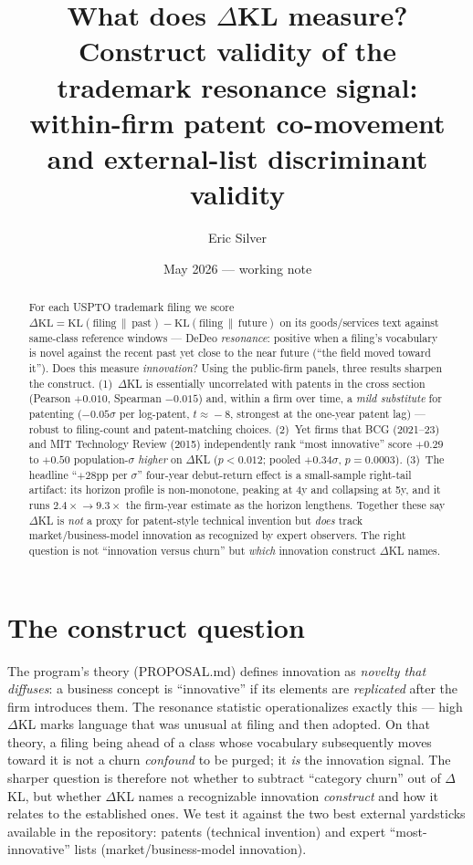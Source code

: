 \documentclass[11pt]{article}
\title{\bfseries What does $\Delta$KL measure?\\
\large Construct validity of the trademark resonance signal:\\
within-firm patent co-movement and external-list discriminant validity}
\author{Eric Silver}
\date{May 2026 --- working note}
\newcommand{\dkl}{$\Delta$KL}
\begin{document}
\maketitle

\begin{abstract}
\noindent For each USPTO trademark filing we score
$\Delta\mathrm{KL}=\mathrm{KL}(\text{filing}\,\|\,\text{past})-\mathrm{KL}(\text{filing}\,\|\,\text{future})$
on its goods/services text against same-class reference windows --- DeDeo
\emph{resonance}: positive when a filing's vocabulary is novel against the recent
past yet close to the near future (``the field moved toward it''). Does this
measure \emph{innovation}? Using the public-firm panels, three results sharpen
the construct. (1)~\dkl{} is essentially uncorrelated with patents in the cross
section (Pearson $+0.010$, Spearman $-0.015$) and, within a firm over time, a
\emph{mild substitute} for patenting ($-0.05\sigma$ per log-patent, $t\!\approx\!-8$,
strongest at the one-year patent lag) --- robust to filing-count and patent-matching
choices. (2)~Yet firms that BCG (2021--23) and MIT Technology Review (2015)
independently rank ``most innovative'' score $+0.29$ to $+0.50$ population-$\sigma$
\emph{higher} on \dkl{} ($p<0.012$; pooled $+0.34\sigma$, $p=0.0003$). (3)~The
headline ``$+28$pp per $\sigma$'' four-year debut-return effect is a small-sample
right-tail artifact: its horizon profile is non-monotone, peaking at 4y and
collapsing at 5y, and it runs $2.4\times\!\to\!9.3\times$ the firm-year estimate as
the horizon lengthens. Together these say \dkl{} is \emph{not} a proxy for
patent-style technical invention but \emph{does} track market/business-model
innovation as recognized by expert observers. The right question is not
``innovation versus churn'' but \emph{which} innovation construct \dkl{} names.
\end{abstract}

\section{The construct question}
The program's theory (PROPOSAL.md) defines innovation as \emph{novelty that
diffuses}: a business concept is ``innovative'' if its elements are
\emph{replicated} after the firm introduces them. The resonance statistic
operationalizes exactly this --- high \dkl{} marks language that was unusual at
filing and then adopted. On that theory, a filing being ahead of a class whose
vocabulary subsequently moves toward it is not a churn \emph{confound} to be
purged; it \emph{is} the innovation signal. The sharper question is therefore not
whether to subtract ``category churn'' out of \dkl{}, but whether \dkl{} names a
recognizable innovation \emph{construct} and how it relates to the established
ones. We test it against the two best external yardsticks available in the
repository: patents (technical invention) and expert ``most-innovative'' lists
(market/business-model innovation).
\end{document}
